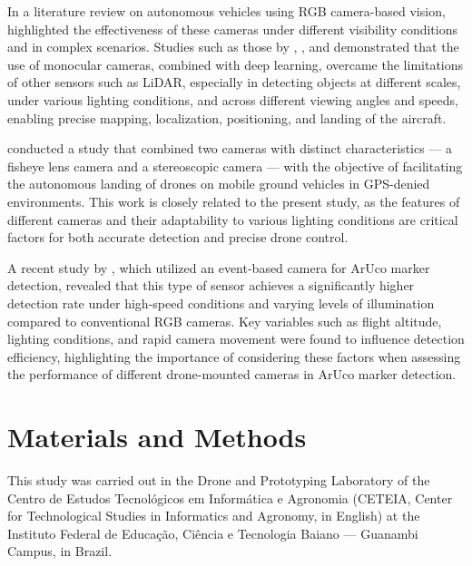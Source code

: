 \documentclass[letterpaper]{article}
\begin{document}
In a literature review on autonomous vehicles using RGB camera-based vision, \cite{pavel2022vision} highlighted the effectiveness of these cameras under different visibility conditions and in complex scenarios. Studies such as those by \cite{borowczyk2017autonomous}, \cite{Munoz-Salinas2017}, and  \cite{hu2019sinet} demonstrated that the use of monocular cameras, combined with deep learning, overcame the limitations of other sensors such as LiDAR, especially in detecting objects at different scales, under various lighting conditions, and across different viewing angles and speeds, enabling precise mapping, localization, positioning, and landing of the aircraft.

\cite{Yang2018} conducted a study that combined two cameras with distinct characteristics — a fisheye lens camera and a stereoscopic camera — with the objective of facilitating the autonomous landing of drones on mobile ground vehicles in GPS-denied environments. This work is closely related to the present study, as the features of different cameras and their adaptability to various lighting conditions are critical factors for both accurate detection and precise drone control.

A recent study by \cite{Sarmadi2021}, which utilized an event-based camera for ArUco marker detection, revealed that this type of sensor achieves a significantly higher detection rate under high-speed conditions and varying levels of illumination compared to conventional RGB cameras. Key variables such as flight altitude, lighting conditions, and rapid camera movement were found to influence detection efficiency, highlighting the importance of considering these factors when assessing the performance of different drone-mounted cameras in ArUco marker detection.


\section{Materials and Methods}
This study was carried out in the Drone and Prototyping Laboratory of the Centro de Estudos Tecnológicos em Informática e Agronomia (CETEIA, Center for Technological Studies in Informatics and Agronomy, in English) at the Instituto Federal de Educação, Ciência e Tecnologia Baiano — Guanambi Campus, in Brazil.
\end{document}
